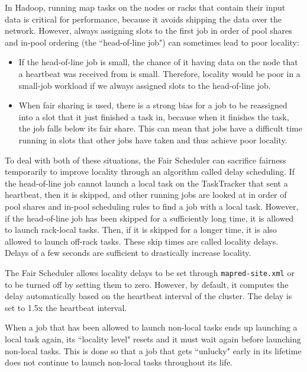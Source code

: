 \documentclass[11pt]{article}
\begin{document}
In Hadoop, running map tasks on the nodes or racks that contain their input data is critical for performance, because it avoids shipping the data over the network. However, always assigning slots to the first job in order of pool shares and in-pool ordering (the ``head-of-line job") can sometimes lead to poor locality:
\begin{itemize}
  \item If the head-of-line job is small, the chance of it having data on the node that a heartbeat was received from is small. Therefore, locality would be poor in a small-job workload if we always assigned slots to the head-of-line job.
  \item When fair sharing is used, there is a strong bias for a job to be reassigned into a slot that it just finished a task in, because when it finishes the task, the job falls below its fair share. This can mean that jobs have a difficult time running in slots that other jobs have taken and thus achieve poor locality.
\end{itemize}

To deal with both of these situations, the Fair Scheduler can sacrifice fairness temporarily to improve locality through an algorithm called delay scheduling. If the head-of-line job cannot launch a local task on the TaskTracker that sent a heartbeat, then it is skipped, and other running jobs are looked at in order of pool shares and in-pool scheduling rules to find a job with a local task. However, if the head-of-line job has been skipped for a sufficiently long time, it is allowed to launch rack-local tasks. Then, if it is skipped for a longer time, it is also allowed to launch off-rack tasks. These skip times are called locality delays. Delays of a few seconds are sufficient to drastically increase locality.

The Fair Scheduler allows locality delays to be set through {\tt mapred-site.xml} or to be turned off by setting them to zero. However, by default, it computes the delay automatically based on the heartbeat interval of the cluster. The delay is set to 1.5x the heartbeat interval.

When a job that has been allowed to launch non-local tasks ends up launching a local task again, its ``locality level" resets and it must wait again before launching non-local tasks. This is done so that a job that gets ``unlucky" early in its lifetime does not continue to launch non-local tasks throughout its life.
\end{document}
